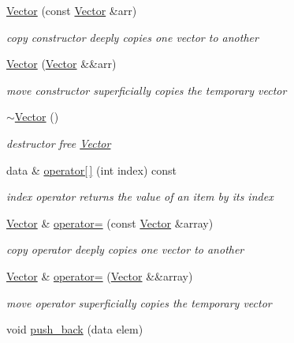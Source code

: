 \begin{DoxyCompactItemize}
\hyperlink{classVector_a7d21adde41c251063fb47f08fc07b870}{Vector} (const \hyperlink{classVector}{Vector} \&arr)
\begin{DoxyCompactList}\small\item\em copy constructor  deeply copies one vector to another \end{DoxyCompactList}\item 
\hyperlink{classVector_a729b947a5289bca0be614283775f0442}{Vector} (\hyperlink{classVector}{Vector} \&\&arr)
\begin{DoxyCompactList}\small\item\em move constructor  superficially copies the temporary vector \end{DoxyCompactList}\item 
\mbox{\label{classVector_afc7759d16cde34ac4a776b501906e0b0}} 
\hyperlink{classVector_afc7759d16cde34ac4a776b501906e0b0}{$\sim$\+Vector} ()
\begin{DoxyCompactList}\small\item\em destructor  free \hyperlink{classVector}{Vector} \end{DoxyCompactList}\item 
data \& \hyperlink{classVector_ad3af3ead835defe8350ec5ddb68d225b}{operator\mbox{[}$\,$\mbox{]}} (int index) const
\begin{DoxyCompactList}\small\item\em index operator  returns the value of an item by its index \end{DoxyCompactList}\item 
\hyperlink{classVector}{Vector} \& \hyperlink{classVector_ad590318f018fb780fb6798ba4d5c951a}{operator=} (const \hyperlink{classVector}{Vector} \&array)
\begin{DoxyCompactList}\small\item\em copy operator  deeply copies one vector to another \end{DoxyCompactList}\item 
\hyperlink{classVector}{Vector} \& \hyperlink{classVector_a95cd9901161724fd71b3968bb72c3906}{operator=} (\hyperlink{classVector}{Vector} \&\&array)
\begin{DoxyCompactList}\small\item\em move operator  superficially copies the temporary vector \end{DoxyCompactList}\item 
void \hyperlink{classVector_a8e34f2f9943752507540bc80dba453fd}{push\+\_\+back} (data elem)

\end{DoxyCompactItemize}
